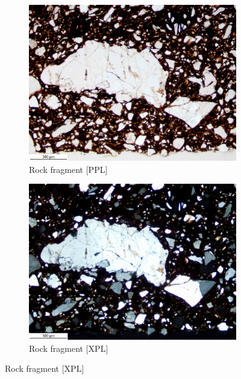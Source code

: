 \documentclass[a4paper]{article}
\begin{document}
\begin{figure}[H]
\begin{subfigure}[t]{.49\textwidth}
		\includegraphics[width=\textwidth]{ThinSections/56-2_4x_PPL.jpg}
		\caption{Rock fragment [PPL]}
	\end{subfigure}\hspace{.5em}\hfill
	\begin{subfigure}[t]{.49\textwidth}
		\includegraphics[width=\textwidth]{ThinSections/56-2_4x_XPL.jpg}
		\caption{Rock fragment [XPL]}
	\end{subfigure}

\end{figure}
\end{document}
